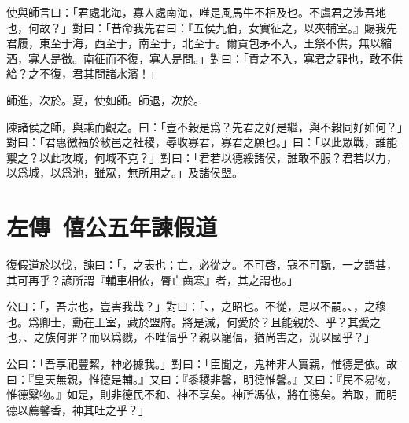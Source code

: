 使與師言曰：「君處北海，寡人處南海，唯是風馬牛不相及也。不虞君之涉吾地也，何故？」對曰：「昔命我先君曰：『五侯九伯，女實征之，以夾輔室。』賜我先君履，東至于海，西至于，南至于，北至于。爾貢包茅不入，王祭不供，無以縮酒，寡人是徵。南征而不復，寡人是問。」對曰：「貢之不入，寡君之罪也，敢不供給？之不復，君其問諸水濱！」

師進，次於。夏，使如師。師退，次於。

陳諸侯之師，與乘而觀之。曰：「豈不榖是爲？先君之好是繼，與不榖同好如何？」對曰：「君惠徼福於敝邑之社稷，辱收寡君，寡君之願也。」曰：「以此眾戰，誰能禦之？以此攻城，何城不克？」對曰：「君若以德綏諸侯，誰敢不服？君若以力，以爲城，以爲池，雖眾，無所用之。」及諸侯盟。

\section[宮之奇諫假道\quad{\small 左傳\ 僖公五年}]{{\normalsize 左傳\ 僖公五年}\quad {}諫假道}
復假道於以伐，諫曰：「，之表也；亡，必從之。不可啓，寇不可翫，一之謂甚，其可再乎？諺所謂『輔車相依，脣亡齒寒』者，其之謂也。」

公曰：「，吾宗也，豈害我哉？」對曰：「、，之昭也。不從，是以不嗣。、，之穆也。爲卿士，勳在王室，藏於盟府。將是滅，何愛於？且能親於、乎？其愛之也，、之族何罪？而以爲戮，不唯偪乎？親以寵偪，猶尚害之，況以國乎？」

公曰：「吾享祀豐{絜}，神必據我。」對曰：「臣聞之，鬼神非人實親，惟德是依。故曰：『皇天無親，惟德是輔。』又曰：『黍稷非馨，明德惟馨。』又曰：『民不易物，惟德繄物。』如是，則非德民不和、神不享矣。神所馮依，將在德矣。若取，而明德以薦馨香，神其吐之乎？」

